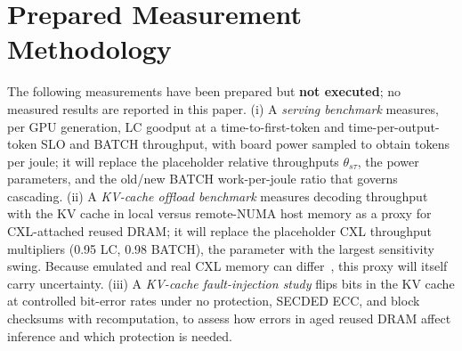 \documentclass{article} %
\begin{document}
\section{Prepared Measurement Methodology}
\label{app:measure}
The following measurements have been prepared but \textbf{not executed}; no measured results are reported in this paper. (i) A \emph{serving benchmark} measures, per GPU generation, LC goodput at a time-to-first-token and time-per-output-token SLO and BATCH throughput, with board power sampled to obtain tokens per joule; it will replace the placeholder relative throughputs $\theta_{s\tau}$, the power parameters, and the old/new BATCH work-per-joule ratio that governs cascading. (ii) A \emph{KV-cache offload benchmark} measures decoding throughput with the KV cache in local versus remote-NUMA host memory as a proxy for CXL-attached reused DRAM; it will replace the placeholder CXL throughput multipliers (0.95 LC, 0.98 BATCH), the parameter with the largest sensitivity swing. Because emulated and real CXL memory can differ~\citep{Sun2023DemystifyingCxl}, this proxy will itself carry uncertainty. (iii) A \emph{KV-cache fault-injection study} flips bits in the KV cache at controlled bit-error rates under no protection, SECDED ECC, and block checksums with recomputation, to assess how errors in aged reused DRAM affect inference and which protection is needed.
\end{document}
